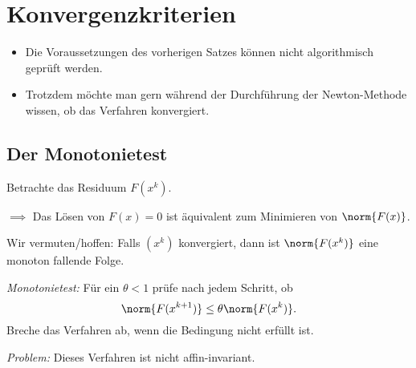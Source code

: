 \section{Konvergenzkriterien}

\begin{itemize}
 \item Die Voraussetzungen des vorherigen Satzes können nicht algorithmisch geprüft werden.

 \item Trotzdem möchte man gern während der Durchführung der Newton-Methode wissen, ob das Verfahren konvergiert.
 \end{itemize}

\subsection{Der Monotonietest}
Betrachte das Residuum $F (x^k )$.

\medskip

$\implies$ Das Lösen von $F(x)=0$ ist äquivalent zum Minimieren von $\norm{F(x)}$.

\bigskip

Wir vermuten/hoffen: Falls $(x^k )$ konvergiert, dann ist $\norm{F(x^k)}$ eine monoton fallende Folge.


\emph{Monotonietest:} Für ein $\theta<1$ prüfe nach jedem Schritt, ob
\begin{equation*}
 \norm{F(x^{k+1})} \leq \theta \norm{F(x^k)}.
\end{equation*}
Breche das Verfahren ab, wenn die Bedingung nicht erfüllt ist.

\bigskip

\emph{Problem:} Dieses Verfahren ist nicht affin-invariant.

